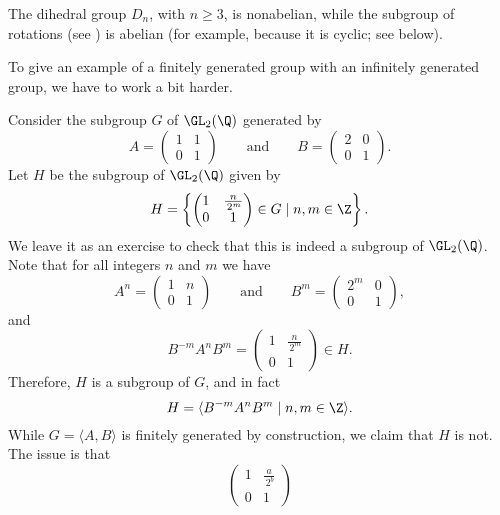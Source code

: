 \begin{example}\label{nonabelian group with abelian subgroup}
	The dihedral group $D_n$, with $n \geqslant 3$, is nonabelian, while the subgroup of rotations (see ) is abelian (for example, because it is cyclic; see  below).
\end{example}

To give an example of a finitely generated group with an infinitely generated group, we have to work a bit harder.

\begin{example}\label{fg group with infinitely generated subgroup}
	Consider the subgroup $G$ of $\GL_2(\Q)$ generated by
	$$A = \begin{pmatrix}
		1 & 1 \\ 0 & 1
	\end{pmatrix} \qquad \textrm{and} \qquad B = \begin{pmatrix}
		2 & 0 \\ 0 & 1
	\end{pmatrix}.$$
	Let $H$ be the subgroup of $\GL_2(\Q)$ given by
	$$H = \left\lbrace \begin{pmatrix} 1 & \frac{n}{\, 2^m} \\ 0 & 1 \end{pmatrix} \in G \displaystyle\mid n, m \in \Z \right\rbrace.$$
	We leave it as an exercise to check that this is indeed a subgroup of $\GL_2(\Q)$. Note that for all integers $n$ and $m$ we have
	$$A^n = \begin{pmatrix} 1 & n \\ 0 & 1 \end{pmatrix} \qquad \textrm{and} \qquad B^m = \begin{pmatrix} 2^m & 0 \\ 0 & 1 \end{pmatrix},$$
	and
	$$B^{-m} A^n B^m = \begin{pmatrix} 1 & \frac{n}{\, 2^m} \\ 0 & 1 \end{pmatrix} \in H.$$
Therefore, $H$ is a subgroup of $G$, and in fact
$$H = \langle B^{-m} A^n B^m \mid n, m \in \Z \rangle.$$
While $G = \langle A, B \rangle$ is finitely generated by construction, we claim that $H$ is not. The issue is that
$$\begin{pmatrix} 1 & \frac{a}{\, 2^b} \\ 0 & 1 \end{pmatrix} 
$$
\end{example}
